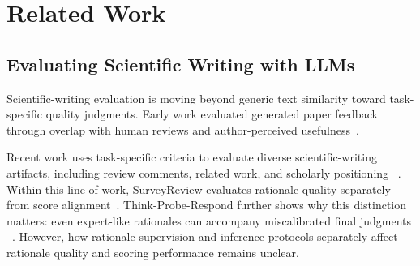 \section{Related Work}
\label{sec:related_work}

\subsection{Evaluating Scientific Writing with LLMs}


Scientific-writing evaluation is moving beyond generic text similarity
toward task-specific quality judgments.
Early work evaluated generated paper feedback through overlap with human reviews
and author-perceived usefulness~\citep{liang-etal-2024-large-scale}.


Recent work uses task-specific criteria to evaluate diverse
scientific-writing artifacts, including review comments, related work,
and scholarly positioning
~\citep{sadallah-etal-2025-good,sahinuc-etal-2025-expert,
xie-etal-2026-rwgbench}.
Within this line of work, SurveyReview evaluates rationale quality
separately from score alignment~\citep{zhang-etal-2026-surveyreview}.
Think-Probe-Respond further shows why this distinction matters:
even expert-like rationales can accompany miscalibrated final judgments
~\citep{schopf-etal-2026-think-probe-respond}.
However, how rationale supervision and inference protocols separately
affect rationale quality and scoring performance remains unclear.


